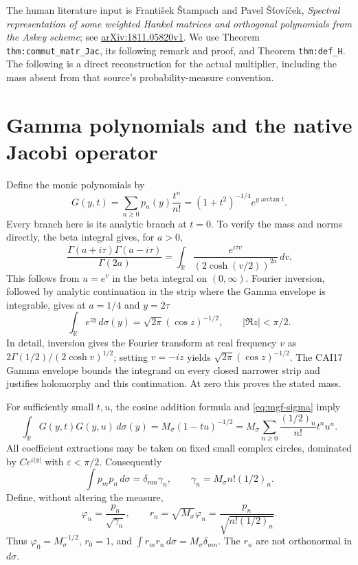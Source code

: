 \documentclass[11pt]{article}
\newcommand{\R}{\mathbb R}
\begin{document}
The human literature input is Franti\v{s}ek \v{S}tampach and Pavel
\v{S}\v{t}ov\'{i}\v{c}ek, \emph{Spectral representation of some
weighted Hankel matrices and orthogonal polynomials from the Askey
scheme}; see
\href{https://arxiv.org/abs/1811.05820v1}{arXiv:1811.05820v1}.
We use Theorem \texttt{thm:commut\_\allowbreak matr\_\allowbreak Jac},
its following remark and proof,
and Theorem \texttt{thm:def\_H}. The following is a direct reconstruction
for the actual multiplier, including the mass absent from that
source's probability-measure convention.

\section{Gamma polynomials and the native Jacobi operator}

Define the monic polynomials by
\begin{equation}\label{eq:generating}
 G(y,t)=\sum_{n\geq0}p_n(y)\frac{t^n}{n!}
       =(1+t^2)^{-1/4}e^{y\arctan t}.
\end{equation}
Every branch here is its analytic branch at $t=0$. To verify the
mass and norms directly, the beta integral gives, for $a>0$,
\[
 \frac{\Gamma(a+i\tau)\Gamma(a-i\tau)}{\Gamma(2a)}
 =\int_\R\frac{e^{i\tau v}}{(2\cosh(v/2))^{2a}}\,dv.
\]
This follows from $u=e^v$ in the beta integral on $(0,\infty)$.
Fourier inversion, followed by analytic continuation in the strip
where the Gamma envelope is integrable, gives at $a=1/4$ and $y=2\tau$
\begin{equation}\label{eq:mgf-sigma}
 \int_\R e^{zy}\,d\sigma(y)
 =\sqrt{2\pi}(\cos z)^{-1/2},\qquad |\Re z|<\pi/2.
\end{equation}
In detail, inversion gives the Fourier transform at real frequency
$v$ as $2\Gamma(1/2)/(2\cosh v)^{1/2}$; setting $v=-iz$ yields
$\sqrt{2\pi}(\cos z)^{-1/2}$. The CAI17 Gamma envelope bounds the
integrand on every closed narrower strip and justifies holomorphy
and this continuation. At zero this proves the stated mass.

For sufficiently small $t,u$, the cosine addition formula and
\eqref{eq:mgf-sigma} imply
\[
 \int_\R G(y,t)G(y,u)\,d\sigma(y)
 =M_\sigma(1-tu)^{-1/2}
 =M_\sigma\sum_{n\geq0}\frac{(1/2)_n}{n!}t^nu^n.
\]
All coefficient extractions may be taken on fixed small complex
circles, dominated by $Ce^{\varepsilon|y|}$ with $\varepsilon<\pi/2$.
Consequently
\[
 \int p_m p_n\,d\sigma=\delta_{mn}\gamma_n,
 \qquad\gamma_n=M_\sigma n!(1/2)_n.
\]
Define, without altering the measure,
\[
 \varphi_n=\frac{p_n}{\sqrt{\gamma_n}},\qquad
 r_n=\sqrt{M_\sigma}\varphi_n
     =\frac{p_n}{\sqrt{n!(1/2)_n}}.
\]
Thus $\varphi_0=M_\sigma^{-1/2}$, $r_0=1$, and
$\int r_mr_n\,d\sigma=M_\sigma\delta_{mn}$.
The $r_n$ are not orthonormal in $d\sigma$.
\end{document}
